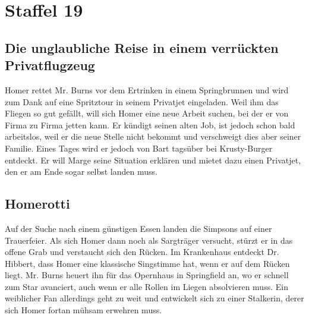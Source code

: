 \section{Staffel 19}

\subsection{Die unglaubliche Reise in einem verrückten Privatflugzeug}
Homer rettet Mr. Burns vor dem Ertrinken in einem Springbrunnen und wird zum Dank auf eine Spritztour in seinem Privatjet eingeladen. Weil ihm das Fliegen so gut gefällt, will sich Homer eine neue Arbeit suchen, bei der er von Firma zu Firma jetten kann. Er kündigt seinen alten Job, ist jedoch schon bald arbeitslos, weil er die neue Stelle nicht bekommt und verschweigt dies aber seiner Familie. Eines Tages wird er jedoch von Bart tagsüber bei Krusty-Burger entdeckt. Er will Marge seine Situation erklären und mietet dazu einen Privatjet, den er am Ende sogar selbst landen muss. 


\subsection{Homerotti}\label{JABF18}
Auf der Suche nach einem günstigen Essen landen die Simpsons auf einer Trauerfeier. Als sich Homer dann noch als Sargträger versucht, stürzt er in das offene Grab und verstaucht sich den Rücken. Im Krankenhaus entdeckt Dr. Hibbert, dass Homer eine klassische Singstimme hat, wenn er auf dem Rücken liegt. Mr. Burns heuert ihn für das Opernhaus in Springfield an, wo er schnell zum Star avanciert, auch wenn er alle Rollen im Liegen absolvieren muss. Ein weiblicher Fan allerdings geht zu weit und entwickelt sich zu einer Stalkerin, derer sich Homer fortan mühsam erwehren muss. 

